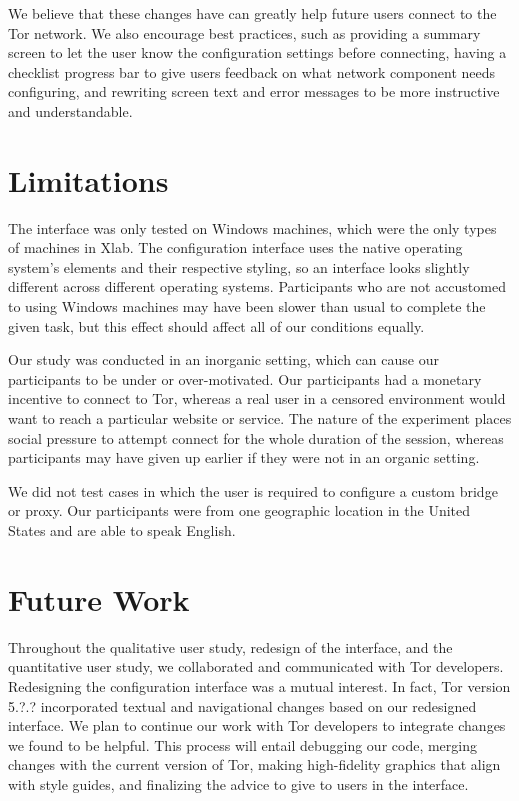 \documentclass[USenglish,oneside,twocolumn]{article}
\begin{document}
We believe that these changes have can greatly help future users connect to the Tor network. We also encourage best practices, such as providing a summary screen to let the user know the configuration settings before connecting, having a checklist progress bar to give users feedback on what network component needs configuring, and rewriting screen text and error messages to be more instructive and understandable. 

\section{Limitations} 
The interface was only tested on Windows machines, which were the only types of machines in Xlab. The configuration interface uses the native operating system's elements and their respective styling, so an interface looks slightly different across different operating systems. Participants who are not accustomed to using Windows machines may have been slower than usual to complete the given task, but this effect should affect all of our conditions equally. 

Our study was conducted in an inorganic setting, which can cause our participants to be under or over-motivated. Our participants had a monetary incentive to connect to Tor, whereas a real user in a censored environment would want to reach a particular website or service. The nature of the experiment places social pressure to attempt connect for the whole duration of the session, whereas participants may have given up earlier if they were not in an organic setting.   

We did not test cases in which the user is required to configure a custom bridge or proxy. Our participants were from one geographic location in the United States and are able to speak English.

\section{Future Work} 
Throughout the qualitative user study, redesign of the interface, and the quantitative user study, we collaborated and communicated with Tor developers. Redesigning the configuration interface was a mutual interest. In fact, Tor version {\color{red} 5.?.?} incorporated textual and navigational changes based on our redesigned interface. We plan to continue our work with Tor developers to integrate changes we found to be helpful. This process will entail debugging our code, merging changes with the current version of Tor, making high-fidelity graphics that align with style guides, and finalizing the advice to give to users in the interface. 
\end{document}
